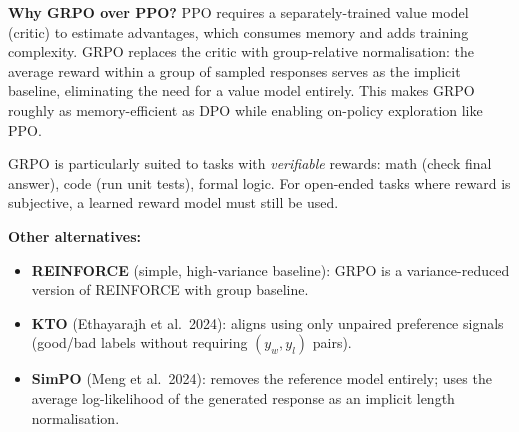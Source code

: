 \textbf{Why GRPO over PPO?} PPO requires a separately-trained value model (critic) to
estimate advantages, which consumes memory and adds training complexity. GRPO replaces
the critic with group-relative normalisation: the average reward within a group of
sampled responses serves as the implicit baseline, eliminating the need for a value
model entirely. This makes GRPO roughly as memory-efficient as DPO while enabling
on-policy exploration like PPO.

\begin{notebox}
  GRPO is particularly suited to tasks with \emph{verifiable} rewards: math (check
  final answer), code (run unit tests), formal logic. For open-ended tasks where reward
  is subjective, a learned reward model must still be used.
\end{notebox}

\textbf{Other alternatives:}
\begin{itemize}
  \item \textbf{REINFORCE} (simple, high-variance baseline): GRPO is a variance-reduced
    version of REINFORCE with group baseline.
  \item \textbf{KTO} (Ethayarajh et al.\ 2024): aligns using only unpaired preference
    signals (good/bad labels without requiring $(y_w, y_l)$ pairs).
  \item \textbf{SimPO} (Meng et al.\ 2024): removes the reference model entirely;
    uses the average log-likelihood of the generated response as an implicit length
    normalisation.
\end{itemize}
